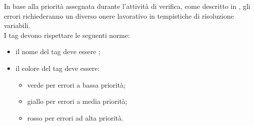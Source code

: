 In base alla priorità assegnata durante l'attività di verifica, come descritto in \PianoDiQualifica, gli errori richiederanno un diverso onere lavorativo in tempistiche di risoluzione variabili.\\
I tag devono rispettare le seguenti norme:
\begin{itemize}
	\item il nome del tag deve essere ;
	\item il colore del tag deve essere:
	\begin{itemize}
		\item verde per errori a bassa priorità;
		\item giallo per errori a media priorità;
		\item rosso per errori ad alta priorità.
	\end{itemize}
\end{itemize}